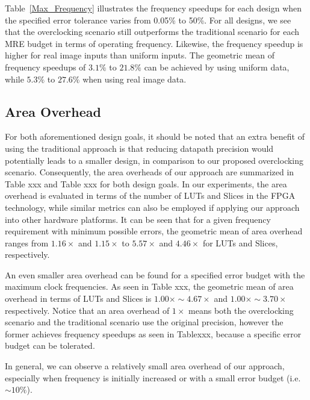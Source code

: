 \documentclass[journal]{IEEEtran}
\begin{document}
Table~\ref{Max_Frequency} illustrates the frequency speedups for each design when the specified error tolerance varies from 0.05\% to 50\%. For all designs, we see that the overclocking scenario still outperforms the traditional scenario for each MRE budget in terms of operating frequency. Likewise, the frequency speedup is higher for real image inputs than uniform inputs. The geometric mean of frequency speedups of $3.1\%$ to $21.8\%$ can be achieved by using uniform data, while $5.3\%$ to $27.6\%$ when using real image data.

\subsection{Area Overhead}
For both aforementioned design goals, it should be noted that an extra benefit of using the traditional approach is that reducing datapath precision would potentially leads to a smaller design, in comparison to our proposed overclocking scenario. Consequently, the area overheads of our approach are summarized in Table xxx and Table xxx for both design goals. In our experiments, the area overhead is evaluated in terms of the number of LUTs and Slices in the FPGA technology, while similar metrics can also be employed if applying our approach into other hardware platforms. It can be seen that for a given frequency requirement with minimum possible errors, the geometric mean of area overhead ranges from $1.16\times$ and $1.15\times$ to $5.57\times$ and $4.46\times$ for LUTs and Slices, respectively.

An even smaller area overhead can be found for a specified error budget with the maximum clock frequencies. As seen in Table xxx, the geometric mean of area overhead in terms of LUTs and Slices is $1.00\times\sim4.67\times$ and $1.00\times\sim3.70\times$ respectively. Notice that an area overhead of $1\times$ means both the overclocking scenario and the traditional scenario use the original precision, however the former achieves frequency speedups as seen in Tablexxx, because a specific error budget can be tolerated.

In general, we can observe a relatively small area overhead of our approach, especially when frequency is initially increased or with a small error budget (i.e. $\sim10\%$).
\end{document}
